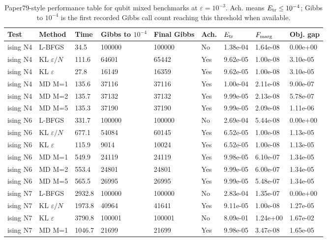 \begin{table}
\caption{Paper79-style performance table for qubit mixed benchmarks at $\varepsilon=10^{-3}$. Ach. means $E_{\rm tr}\le 10^{-4}$; Gibbs to $10^{-4}$ is the first recorded Gibbs call count reaching this threshold when available.}
\label{tab:paper79-style-qubit}
\begin{tabular}{lllllllll}
\toprule
Test & Method & Time & Gibbs to $10^{-4}$ & Final Gibbs & Ach. & $E_{\rm tr}$ & $F_{\rm marg}$ & Obj. gap \\
\midrule
ising N4 & L-BFGS & 34.5 & 100000 & 100000 & No & 1.38e-04 & 1.64e-08 & 0.00e+00 \\
ising N4 & KL $\varepsilon/N$ & 111.6 & 64601 & 65442 & Yes & 9.62e-05 & 1.00e-08 & 3.10e-05 \\
ising N4 & KL $\varepsilon$ & 27.8 & 16149 & 16359 & Yes & 9.62e-05 & 1.00e-08 & 3.10e-05 \\
ising N4 & MD M=1 & 135.6 & 37116 & 37116 & Yes & 1.00e-04 & 2.11e-08 & 9.00e-07 \\
ising N4 & MD M=2 & 135.7 & 37132 & 37132 & Yes & 9.99e-05 & 2.13e-08 & 5.78e-07 \\
ising N4 & MD M=5 & 135.3 & 37190 & 37190 & Yes & 9.99e-05 & 2.09e-08 & 1.11e-06 \\
ising N6 & L-BFGS & 331.7 & 100000 & 100000 & No & 2.69e-04 & 5.44e-08 & 0.00e+00 \\
ising N6 & KL $\varepsilon/N$ & 677.1 & 54084 & 60145 & Yes & 6.52e-05 & 1.00e-08 & 1.13e-05 \\
ising N6 & KL $\varepsilon$ & 115.9 & 9014 & 10024 & Yes & 6.52e-05 & 1.00e-08 & 1.13e-05 \\
ising N6 & MD M=1 & 549.9 & 24119 & 24119 & Yes & 9.98e-05 & 6.10e-07 & 1.34e-05 \\
ising N6 & MD M=2 & 553.4 & 24801 & 24801 & Yes & 9.99e-05 & 6.00e-07 & 1.34e-05 \\
ising N6 & MD M=5 & 565.5 & 26995 & 26995 & Yes & 9.99e-05 & 5.48e-07 & 1.34e-05 \\
ising N7 & L-BFGS & 2932.8 & 100000 & 100000 & No & 2.83e-04 & 1.35e-07 & 0.00e+00 \\
ising N7 & KL $\varepsilon/N$ & 1973.8 & 40964 & 41641 & Yes & 9.11e-05 & 1.00e-08 & 1.27e-05 \\
ising N7 & KL $\varepsilon$ & 3790.8 & 100001 & 100001 & No & 8.09e-01 & 1.24e+00 & 1.67e-02 \\
ising N7 & MD M=1 & 1046.7 & 21699 & 21699 & Yes & 9.98e-05 & 3.47e-08 & 1.65e-05 \\

\end{tabular}
\end{table}
